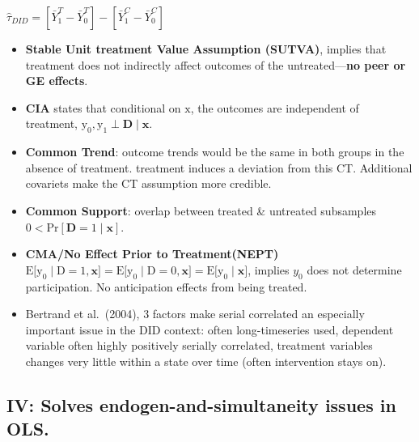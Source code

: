 \documentclass[
]{article}
\providecommand{\tightlist}{%
  \setlength{\itemsep}{0pt}\setlength{\parskip}{0pt}}
\begin{document}
\(\hat{\tau}_{D I D}=\left[\bar{Y}_{1}^{T}-\bar{Y}_{0}^{T}\right]-\left[\bar{Y}_{1}^{C}-\bar{Y}_{0}^{C}\right]\)

\begin{itemize}
\tightlist
\item
  \textbf{Stable Unit treatment Value Assumption (SUTVA)}, implies that
  treatment does not indirectly affect outcomes of the
  untreated---\textbf{no peer or GE effects}.
\item
  \textbf{CIA} states that conditional on \(\mathrm{x}\), the outcomes
  are independent of treatment,
  \(\mathrm{y_0, y_1 \perp \mathbf{D}\mid \mathbf{x}}.\)
\item
  \textbf{Common Trend}: outcome trends would be the same in both groups
  in the absence of treatment. treatment induces a deviation from this
  CT. Additional covariets make the CT assumption more credible.
\item
  \textbf{Common Support}: overlap between treated \& untreated
  subsamples \(\mathrm{0<Pr[\mathbf{D}=1\mid \mathbf{x}]}\).
\item
  \textbf{CMA/No Effect Prior to Treatment(NEPT)}
  \(\mathrm{E\bigl[y_0\mid D=1,\mathbf{x}\bigr]=E\bigl[y_0\mid D=0,\mathbf{x}\bigr]=E\bigl[y_0\mid\mathbf{x}\bigr]}\),
  implies \(y_0\) does not determine participation. No anticipation
  effects from being treated.
\item
  Bertrand et al.~(2004), 3 factors make serial correlated an especially
  important issue in the DID context: often long-timeseries used,
  dependent variable often highly positively serially correlated,
  treatment variables changes very little within a state over time
  (often intervention stays on).
\end{itemize}

\hypertarget{iv-solves-endogen-and-simultaneity-issues-in-ols.}{%
\subsection{\texorpdfstring{\textbf{IV}: Solves endogen-and-simultaneity
issues in
OLS.}{IV: Solves endogen-and-simultaneity issues in OLS.}}\label{iv-solves-endogen-and-simultaneity-issues-in-ols.}}
\end{document}
